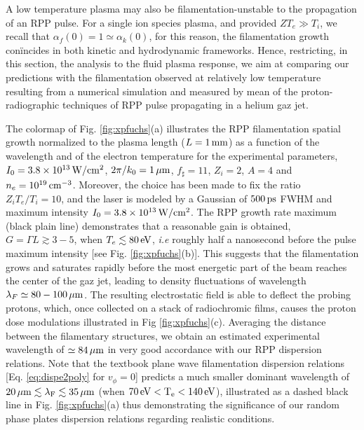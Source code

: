 \documentclass[
 reprint,
 amsmath,amssymb,
 aps,
]{revtex4-1}
\begin{document}
A low temperature plasma may also be filamentation-unstable to the  propagation of an RPP pulse.
For a single ion species plasma, and provided $ZT_e\gg T_i$,   we recall that $\alpha_f(0)=1\simeq \alpha_k(0)$, for this reason, the filamentation growth con\"incides in both  kinetic and hydrodynamic frameworks. 
Hence, restricting, in this section, the analysis to the fluid plasma response, we aim at comparing our predictions with the filamentation observed at relatively low temperature resulting from a numerical simulation and measured by mean of the proton-radiographic techniques of RPP pulse propagating  in a helium gaz jet.

The colormap of Fig. \ref{fig:xpfuchs}(a) illustrates the RPP filamentation spatial  growth normalized to the plasma length ($L=1\,\rm mm$) as a function of the wavelength and of the electron temperature for the experimental parameters, $I_0=3.8\times 10^{13}\, \rm W/cm^2$, $2\pi/k_0=1\,\rm\mu m$, $f_\sharp=11$, $Z_i=2$, $A=4$ and $n_e=10^{19} \,\rm cm^{-3}$. Moreover, the choice has been made to fix the ratio  $Z_iT_e/T_i=10$, and the laser is modeled by a Gaussian of $500\,\rm ps$ FWHM and maximum intensity $I_0=3.8\times 10^{13}\, \rm W/cm^2$. The RPP growth rate maximum (black plain line) demonstrates that a reasonable gain is obtained,  $G=\Gamma L\gtrsim 3-5$, when $T_e\lesssim 80\, \rm eV$, \emph{i.e} roughly half a nanosecond before the pulse maximum intensity  [see Fig. \ref{fig:xpfuchs}(b)]. 
This suggests that the filamentation grows and saturates rapidly before the most energetic part of the beam reaches the center of the gaz jet, leading to  density fluctuations of wavelength   $\lambda_F \simeq 80-100 \,\rm\mu m$. The resulting electrostatic field is able to deflect the probing protons, which, once collected on a stack of radiochromic films, causes the proton dose modulations illustrated in Fig \ref{fig:xpfuchs}(c). Averaging the distance between the filamentary structures, we obtain an estimated experimental wavelength of $\simeq 84 \,\rm\mu m$ in very good accordance with our RPP dispersion relations. 
Note that the textbook plane wave filamentation dispersion relations [Eq. \eqref{eq:dispe2poly} for $v_\phi=0$] predicts a much smaller dominant wavelength of $20\, \rm{\mu m} \lesssim \lambda_F\lesssim  35\, \rm\mu m$ (when $70\, \rm{eV}<T_e<140\, \rm eV$), illustrated as a dashed black line in Fig. \ref{fig:xpfuchs}(a) thus demonstrating the significance of our random phase plates dispersion relations regarding realistic conditions. 
\end{document}
